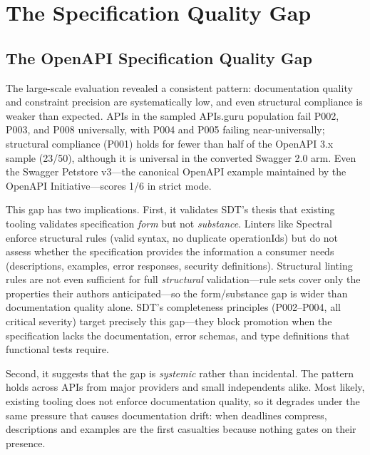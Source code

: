 \section{The Specification Quality Gap}
\label{sec:quality-gap}

\subsection{The OpenAPI Specification Quality Gap}
\label{subsec:openapi-quality-gap}

The large-scale evaluation revealed a consistent pattern: documentation quality and constraint precision are systematically low, and even structural compliance is weaker than expected. APIs in the sampled APIs.guru population fail P002, P003, and P008 universally, with P004 and P005 failing near-universally; structural compliance (P001) holds for fewer than half of the OpenAPI 3.x sample (23/50), although it is universal in the converted Swagger 2.0 arm. Even the Swagger Petstore v3---the canonical OpenAPI example maintained by the OpenAPI Initiative---scores 1/6 in strict mode.

This gap has two implications. First, it validates SDT's thesis that existing tooling validates specification \textit{form} but not \textit{substance}. Linters like Spectral enforce structural rules (valid syntax, no duplicate operationIds) but do not assess whether the specification provides the information a consumer needs (descriptions, examples, error responses, security definitions). Structural linting rules are not even sufficient for full \emph{structural} validation---rule sets cover only the properties their authors anticipated---so the form/substance gap is wider than documentation quality alone. SDT's completeness principles (P002--P004, all critical severity) target precisely this gap---they block promotion when the specification lacks the documentation, error schemas, and type definitions that functional tests require.

Second, it suggests that the gap is \textit{systemic} rather than incidental. The pattern holds across APIs from major providers and small independents alike. Most likely, existing tooling does not enforce documentation quality, so it degrades under the same pressure that causes documentation drift: when deadlines compress, descriptions and examples are the first casualties because nothing gates on their presence.

